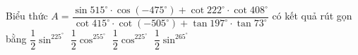 \begin{ex}%
	Biểu thức $A=\dfrac{\sin 515^{\circ} \cdot \cos \left(-475^{\circ}\right)+\cot 222^{\circ} \cdot \cot 408^{\circ}}{\cot 415^{\circ} \cdot \cot \left(-505^{\circ}\right)+\tan 197^{\circ}  \cdot \tan 73^{\circ}}$ có kết quả rút gọn bằng
	\choice 
		{$\dfrac{1}{2} \sin  ^225^{\circ}$}
		{$\dfrac{1}{2}  \cos ^255^{\circ}$}
		{\True  $\dfrac{1}{2} \cos ^225^{\circ}$}
		{$\dfrac{1}{2} \sin  ^265^{\circ}$}
\end{ex}

